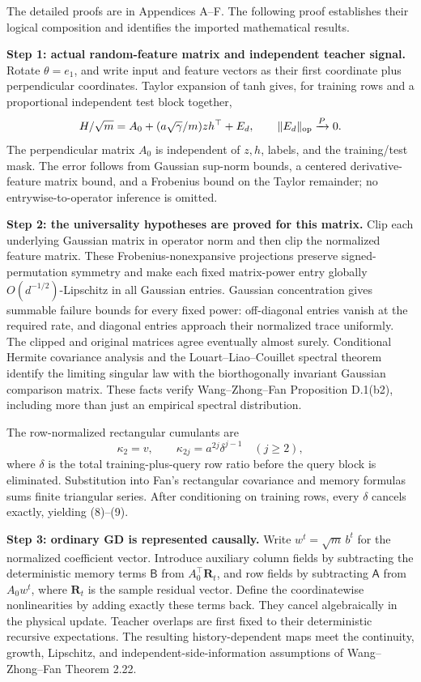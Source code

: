 \documentclass[
  11pt,
  a4paper,
]{article}
\begin{document}
The detailed proofs are in Appendices A--F. The following proof
establishes their logical composition and identifies the imported
mathematical results.

\textbf{Step 1: actual random-feature matrix and independent teacher
signal.} Rotate \(\theta=e_1\), and write input and feature vectors as
their first coordinate plus perpendicular coordinates. Taylor expansion
of tanh gives, for training rows and a proportional independent test
block together, \[
H/\sqrt m=A_0+(a\sqrt\gamma/m)zh^\top+E_d,
\qquad \|E_d\|_{\rm op}\xrightarrow{P}0.
\] The perpendicular matrix \(A_0\) is independent of \(z,h\), labels,
and the training/test mask. The error follows from Gaussian sup-norm
bounds, a centered derivative-feature matrix bound, and a Frobenius
bound on the Taylor remainder; no entrywise-to-operator inference is
omitted.

\textbf{Step 2: the universality hypotheses are proved for this matrix.}
Clip each underlying Gaussian matrix in operator norm and then clip the
normalized feature matrix. These Frobenius-nonexpansive projections
preserve signed-permutation symmetry and make each fixed matrix-power
entry globally \(O(d^{-1/2})\)-Lipschitz in all Gaussian entries.
Gaussian concentration gives summable failure bounds for every fixed
power: off-diagonal entries vanish at the required rate, and diagonal
entries approach their normalized trace uniformly. The clipped and
original matrices agree eventually almost surely. Conditional Hermite
covariance analysis and the Louart--Liao--Couillet spectral theorem
identify the limiting singular law with the biorthogonally invariant
Gaussian comparison matrix. These facts verify Wang--Zhong--Fan
Proposition D.1(b2), including more than just an empirical spectral
distribution.

The row-normalized rectangular cumulants are \[
\kappa_2=v,\qquad \kappa_{2j}=a^{2j}\delta^{j-1}\quad(j\ge2),
\] where \(\delta\) is the total training-plus-query row ratio before
the query block is eliminated. Substitution into Fan's rectangular
covariance and memory formulas sums finite triangular series. After
conditioning on training rows, every \(\delta\) cancels exactly,
yielding (8)--(9).

\textbf{Step 3: ordinary GD is represented causally.} Write
\(w^t=\sqrt m\,b^t\) for the normalized coefficient vector. Introduce
auxiliary column fields by subtracting the deterministic memory terms
\(\mathsf B\) from \(A_0^\top\mathbf R_t\), and row fields by
subtracting \(\mathsf A\) from \(A_0w^t\), where \(\mathbf R_t\) is the
sample residual vector. Define the coordinatewise nonlinearities by
adding exactly these terms back. They cancel algebraically in the
physical update. Teacher overlaps are first fixed to their deterministic
recursive expectations. The resulting history-dependent maps meet the
continuity, growth, Lipschitz, and independent-side-information
assumptions of Wang--Zhong--Fan Theorem 2.22.
\end{document}
